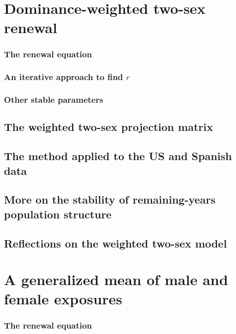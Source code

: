   \chapter{Dominance-weighted two-sex renewal}
    
    \subsection{The renewal equation}
      
    \subsection{An iterative approach to find $r$}
      
    \subsection{Other stable parameters}
      
  \section{The weighted two-sex projection matrix}
      
  \section{The method applied to the US and Spanish data}
      
  \section{More on the stability of remaining-years population structure}
    
  \section{Reflections on the weighted two-sex model}
      
  

  \chapter{A generalized mean of male and female exposures}
    
      \subsection{The renewal equation}
         
